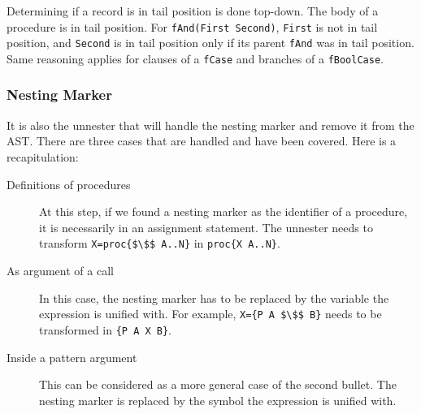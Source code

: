 \documentclass[a4paper]{memoir}
\begin{document}
Determining if a record is in tail position is done top-down.
The body of a procedure is in tail position. For \lstinline!fAnd(First Second)!,
\lstinline!First! is not in tail position, and \lstinline!Second! is in tail
position only if its parent \lstinline!fAnd! was in tail position.
Same reasoning applies for clauses of a \lstinline!fCase! and branches of a
\lstinline!fBoolCase!.



\subsubsection{Nesting Marker}\label{sec:arch:unnester:nestingmarker}
It is also the unnester that will handle the nesting marker and remove it from
the AST. There are three cases that are handled and have been covered. Here is a
recapitulation:
\begin{description}
  \item[Definitions of procedures] At this step, if we found a nesting marker as the identifier of a procedure, it is necessarily in an assignment statement. The unnester needs to transform \lstinline[mathescape]!X=proc{$\$$ A..N}! in \lstinline!proc{X A..N}!.
  \item[As argument of a call] In this case, the nesting marker has to be
    replaced by the variable the expression is unified with. For example, \lstinline[mathescape]!X={P A $\$$ B}! needs to be transformed in  \lstinline!{P A X B}!. 
  \item[Inside a pattern argument] This can be considered as a more general case
    of the second bullet. The nesting marker is replaced by the symbol the
    expression is unified with.
\end{description}
\end{document}
